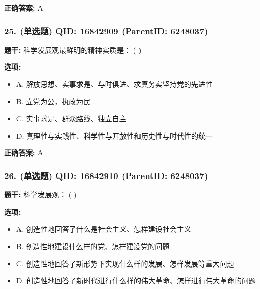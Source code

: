 \documentclass[12pt,UTF8]{ctexart}
\begin{document}
\textbf{正确答案:}
A

\vspace{0.3em}\hrulefill\vspace{0.7em}

\subsubsection*{25. (单选题) \small QID: 16842909 (ParentID: 6248037)}

\textbf{题干:}
科学发展观最鲜明的精神实质是： ( )



\textbf{选项:}
\begin{itemize}[leftmargin=*]

  \item A. 解放思想、实事求是、与时俱进、求真务实坚持党的先进性

  \item B. 立党为公，执政为民

  \item C. 实事求是、群众路线、独立自主

  \item D. 真理性与实践性、科学性与开放性和历史性与时代性的统一

\end{itemize}

\textbf{正确答案:}
A

\vspace{0.3em}\hrulefill\vspace{0.7em}

\subsubsection*{26. (单选题) \small QID: 16842910 (ParentID: 6248037)}

\textbf{题干:}
科学发展观： ( )



\textbf{选项:}
\begin{itemize}[leftmargin=*]

  \item A. 创造性地回答了什么是社会主义、怎样建设社会主义

  \item B. 创造性地建设什么样的党、怎样建设党的问题

  \item C. 创造性地回答了新形势下实现什么样的发展、怎样发展等重大问题

  \item D. 创造性地回答了新时代进行什么样的伟大革命、怎样进行伟大革命的问题

\end{itemize}
\end{document}
